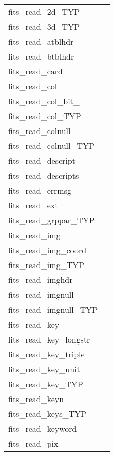 \documentclass[11pt]{book}
\begin{document}
\begin{tabular}{lr}
fits\_read\_2d\_TYP      & \pageref{ffg2dx} \\
fits\_read\_3d\_TYP      & \pageref{ffg3dx} \\
fits\_read\_atblhdr      & \pageref{ffghtb} \\
fits\_read\_btblhdr      & \pageref{ffghbn} \\
fits\_read\_card         & \pageref{ffgcrd} \\
fits\_read\_col        & \pageref{ffgcv} \\
fits\_read\_col\_bit\_ & \pageref{ffgcx} \\
fits\_read\_col\_TYP    & \pageref{ffgcvx} \\
fits\_read\_colnull    & \pageref{ffgcf} \\
fits\_read\_colnull\_TYP    & \pageref{ffgcfx} \\
fits\_read\_descript & \pageref{ffgdes} \\
fits\_read\_descripts & \pageref{ffgdes} \\
fits\_read\_errmsg    & \pageref{ffgmsg} \\
fits\_read\_ext        & \pageref{ffgextn} \\
fits\_read\_grppar\_TYP  & \pageref{ffggpx} \\
fits\_read\_img         & \pageref{ffgpv} \\
fits\_read\_img\_coord & \pageref{ffgics} \\
fits\_read\_img\_TYP     & \pageref{ffgpvx} \\
fits\_read\_imghdr       & \pageref{ffghpr} \\
fits\_read\_imgnull & \pageref{ffgpf} \\
fits\_read\_imgnull\_TYP & \pageref{ffgpfx} \\
fits\_read\_key          & \pageref{ffgky} \\
fits\_read\_key\_longstr  & \pageref{ffgkls} \\
fits\_read\_key\_triple   & \pageref{ffgkyt} \\
fits\_read\_key\_unit     & \pageref{ffgunt} \\
fits\_read\_key\_TYP      & \pageref{ffgkyx} \\
fits\_read\_keyn         & \pageref{ffgkyn} \\
fits\_read\_keys\_TYP     & \pageref{ffgknx} \\
fits\_read\_keyword      & \pageref{ffgkey} \\
fits\_read\_pix  & \pageref{ffgpxv} \\

\end{tabular}
\end{document}
